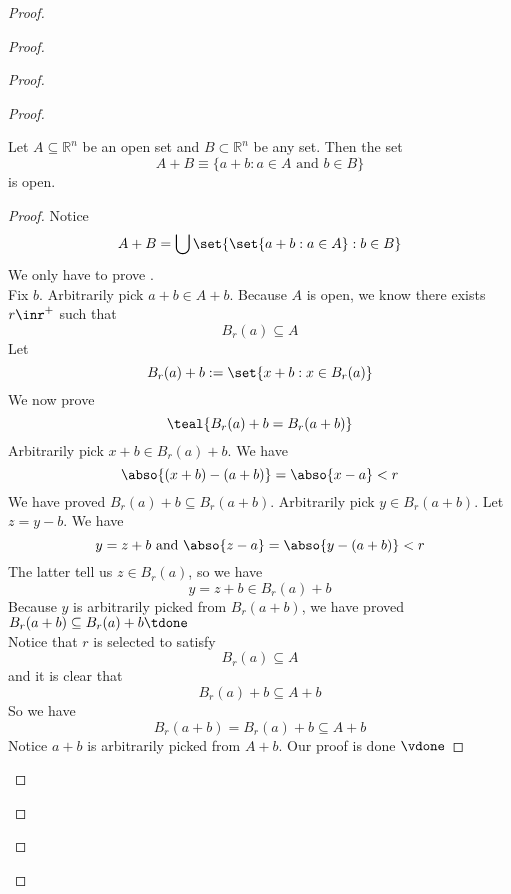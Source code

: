 \documentclass{report}
\begin{document}
\begin{proof}
\begin{proof}
\begin{proof}
\begin{proof}
\begin{question}{}{}
Let \(A \subseteq \mathbb{R}^n\) be an open set and \(B \subset \mathbb{R}^n\) be any set. Then the set 
\[ A + B \equiv \{a + b : a \in A \text{ and } b \in B\} \]
is open.
\end{question}
\begin{proof}
Notice 
\begin{equation*}
A+B= \bigcup \set{\set{a+b:a\in A}:b\in B}
\end{equation*}
We only have to prove  .\\

Fix $b$. Arbitrarily pick $a+b\in A+b$. Because $A$ is open, we know there exists $r\inr^+$ such that
\begin{equation*}
B_r(a)\subseteq A
\end{equation*}
Let
\begin{equation*}
B_r(a)+b:=\set{x+b:x\in B_r(a)}
\end{equation*}
We now prove 
\begin{equation*}
\teal{B_r(a)+b=B_r(a+b)}
\end{equation*}
Arbitrarily pick $x+b\in B_r(a)+b$. We have
\begin{equation*}
\abso{(x+b)-(a+b)}=\abso{x-a}<r
\end{equation*}
We have proved $B_r(a)+b\subseteq B_r(a+b)$. Arbitrarily pick $y\in B_r(a+b)$. Let $z=y-b$. We have
\begin{equation*}
y=z+b\text{ and }\abso{z-a}=\abso{y-(a+b)}<r
\end{equation*}
The latter tell us $z \in B_r(a)$, so we have
\begin{equation*}
y=z+b \in B_r(a)+b
\end{equation*}
Because $y$ is arbitrarily picked from $B_r(a+b)$, we have proved $B_r(a+b)\subseteq B_r(a)+b\tdone$\\

Notice that  $r$ is selected to satisfy
\begin{equation*}
B_r(a)\subseteq A
\end{equation*}
and it is clear that
\begin{equation*}
B_r(a)+b\subseteq A+b
\end{equation*}
So we have
\begin{equation*}
B_r(a+b)=B_r(a)+b\subseteq A+b
\end{equation*}
Notice $a+b$ is arbitrarily picked from $A+b$. Our proof is done  $\vdone$
\end{proof}


\end{proof}
\end{proof}
\end{proof}
\end{proof}
\end{document}
